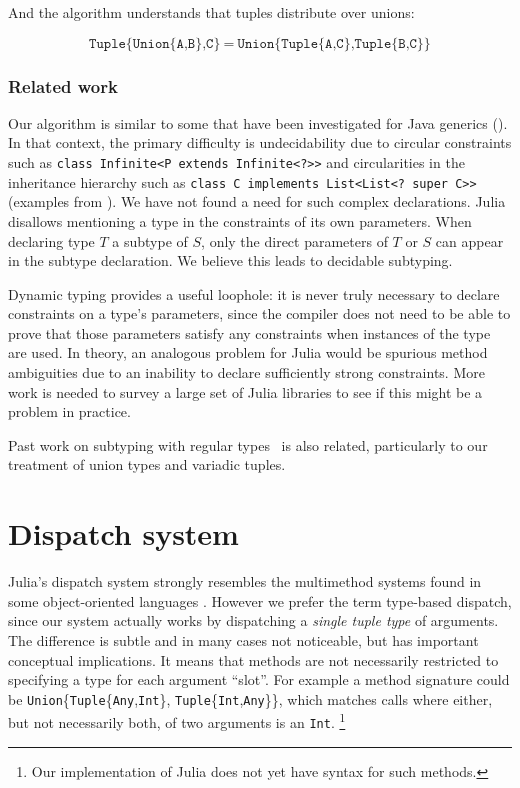 \noindent
And the algorithm understands that tuples distribute over unions:

\vspace{-3ex}
\[
\texttt{Tuple\{Union\{A,B\},C\}}\ =\ \texttt{Union\{Tuple\{A,C\},Tuple\{B,C\}\}}
\]

\subsubsection{Related work}

Our algorithm is similar to some that have been investigated for Java
generics (\cite{wehr2008subtyping, Cameron:2009:SWE:1557898.1557902,
Tate:2011:TWJ:1993316.1993570}).
In that context, the primary difficulty is undecidability due to
circular constraints such as \texttt{class Infinite<P extends Infinite<?>>}
and circularities in the inheritance hierarchy such as
\texttt{class C implements List<List<?\ super C>>} (examples from
\cite{Tate:2011:TWJ:1993316.1993570}).
We have not found a need for such complex declarations.
Julia disallows mentioning a type in the constraints of its own parameters.
When declaring type $T$ a subtype of $S$, only the direct parameters of
$T$ or $S$ can appear in the subtype declaration.
We believe this leads to decidable subtyping.

Dynamic typing provides a useful loophole: it is never truly
necessary to declare constraints on a type's parameters, since
the compiler does not need to be able to prove that those
parameters satisfy any constraints when instances of the type are
used.
In theory, an analogous problem for Julia would be spurious method
ambiguities due to an inability to declare sufficiently strong
constraints.
More work is needed to survey a large set of Julia libraries to see
if this might be a problem in practice.

Past work on subtyping with regular
types~\cite{hosoya2000regular, xtatic} is also related, particularly
to our treatment of union types and variadic tuples.


\section{Dispatch system}


Julia's dispatch system strongly resembles the multimethod systems
found in some object-oriented languages
\cite{closspec,closoverview,dylanlang,cecil,cecilspec,chambers2006diesel}.
However we prefer the term type-based dispatch, since our system
actually works by dispatching a \emph{single tuple type} of arguments.
The difference is subtle and in many cases not noticeable, but has
important conceptual implications.
It means that methods are not necessarily restricted to specifying
a type for each argument ``slot''.
For example a method signature could be
\texttt{Union}\{\texttt{Tuple}\{\texttt{Any},\texttt{Int}\}, \texttt{Tuple}\{\texttt{Int},\texttt{Any}\}\},
which matches calls where either, but not necessarily both, of two
arguments is an \texttt{Int}.
\footnote{Our implementation of Julia does not yet have syntax for such methods.}

